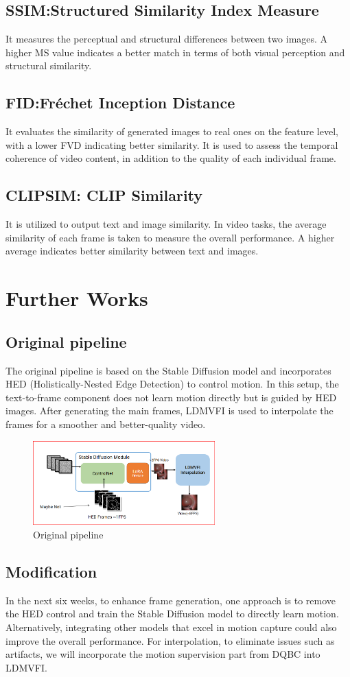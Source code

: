 \documentclass[lettersize,journal]{IEEEtran}
\begin{document}
\subsection{SSIM:Structured Similarity Index Measure}
It measures the perceptual and structural differences between two images. A higher MS value indicates a better match in terms of both visual perception and structural similarity.
\subsection{FID:Fréchet Inception Distance}
It evaluates the similarity of generated images to real ones on the feature level, with a lower FVD indicating better similarity. It is used to assess the temporal coherence of video content, in addition to the quality of each individual frame.
\subsection{CLIPSIM: CLIP Similarity}
It is utilized to output text and image similarity. In video tasks, the average similarity of each frame is taken to measure the overall performance. A higher average indicates better similarity between text and images.

\section{Further Works}
\subsection{Original pipeline}
The original pipeline is based on the Stable Diffusion model and incorporates HED (Holistically-Nested Edge Detection) to control motion. In this setup, the text-to-frame component does not learn motion directly but is guided by HED images. After generating the main frames, LDMVFI is used to interpolate the frames for a smoother and better-quality video.
\begin{figure}[h!]
    \centering
    \includegraphics[width=7cm]{Image/Original pipeline.png}
    \caption{Original pipeline}
    \label{fig-sample}
\end{figure}

\subsection{Modification}
In the next six weeks, to enhance frame generation, one approach is to remove the HED control and train the Stable Diffusion model to directly learn motion. Alternatively, integrating other models that excel in motion capture could also improve the overall performance. For interpolation, to eliminate issues such as artifacts, we will incorporate the motion supervision part from DQBC into LDMVFI.
\end{document}
